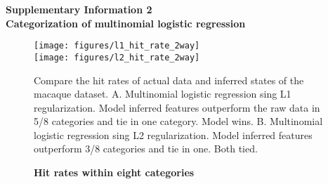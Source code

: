 
\begin{flushleft}
{\Large
\textbf{Supplementary Information 2 \\ Categorization of multinomial logistic regression \\}
}
\end{flushleft}

\begin{figure}[!h]
    \texttt{[image: figures/l1\_hit\_rate\_2way]}\\
    \texttt{[image: figures/l2\_hit\_rate\_2way]}
	\caption{\bf Hit rates within eight categories} Compare the hit rates of actual data and inferred states of the macaque dataset. A. Multinomial logistic regression sing L1 regularization. Model inferred features outperform the raw data in 5/8 categories and tie in one category. Model wins. B. Multinomial logistic regression sing L2 regularization. Model inferred features outperform 3/8 categories and tie in one. Both tied.
	\label{fig:softmax}
\end{figure}

